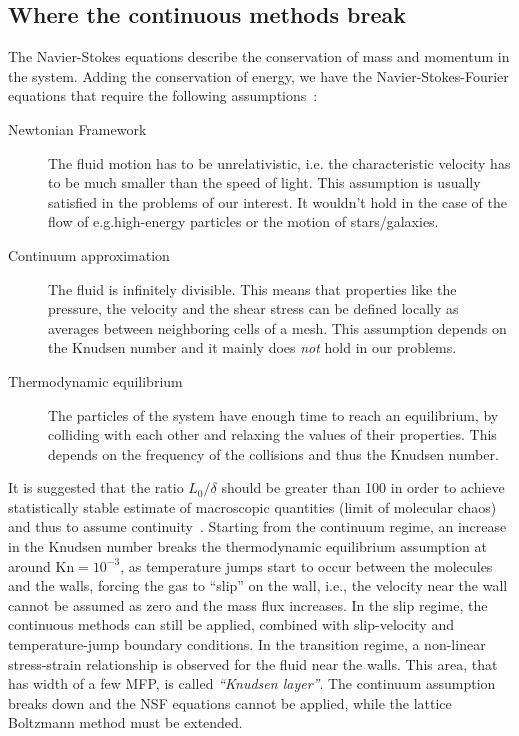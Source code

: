 \subsection{Where the continuous methods break}
The Navier-Stokes equations describe the conservation of mass and momentum in
the system. Adding the conservation of energy, we have the Navier-Stokes-Fourier
equations that require the following assumptions~\cite{Barber2006}:
\begin{description}
 \item[Newtonian Framework] The fluid motion has to be unrelativistic, i.e.\@ 
 the characteristic velocity has to be much smaller than the speed of light.
 This assumption is usually satisfied in the problems of our interest.
 It wouldn't hold in the case of the flow of e.g.\@ high-energy particles
 or the motion of stars/galaxies.
 \item[Continuum approximation] The fluid is infinitely divisible. This means that
 properties like the pressure, the velocity and the shear stress can be defined locally as averages between
 neighboring cells of a mesh. This assumption depends on the Knudsen number and it mainly does \textit{not} hold in our problems.
 \item[Thermodynamic equilibrium] The particles of the system have enough time to reach
 an equilibrium, by colliding with each other and relaxing the values of their properties.
 This depends on the frequency of the collisions and thus the Knudsen number.
\end{description}

It is suggested that the ratio $L_0/\delta$ should be greater than 100 in order
to achieve statistically stable estimate of macroscopic quantities
(limit of molecular chaos) and thus to assume continuity~\cite{Barber2006}.
Starting from the continuum regime, an increase in the Knudsen number breaks
the thermodynamic equilibrium assumption at around $\mathrm{Kn}=10^{-3}$,
as temperature jumps start to occur between the molecules and the walls,
forcing the gas to ``slip'' on the wall, i.e.\@, the velocity near the wall cannot
be assumed as zero and the mass flux increases.
In the slip regime, the continuous methods can still be applied, combined with slip-velocity
and temperature-jump boundary conditions. In the transition regime,
a non-linear stress-strain relationship is observed for the fluid near the walls.
This area, that has width of a few MFP, is called \textit{``Knudsen layer''}. The 
continuum assumption breaks down and the NSF equations cannot be applied, while
the lattice Boltzmann method must be extended.
